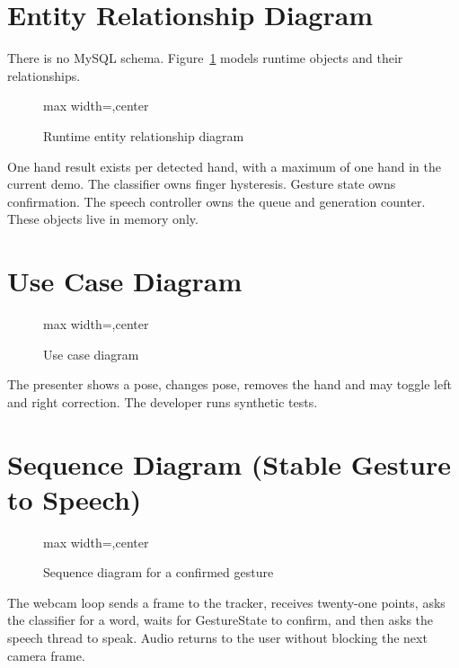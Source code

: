 \section{Entity Relationship Diagram}
There is no MySQL schema. Figure~\ref{fig:er} models runtime objects and their relationships.

\begin{figure}[H]
\centering
\begin{adjustbox}{max width=\textwidth,center}

\end{adjustbox}
\caption{Runtime entity relationship diagram}
\label{fig:er}
\end{figure}

One hand result exists per detected hand, with a maximum of one hand in the current demo. The classifier owns finger hysteresis. Gesture state owns confirmation. The speech controller owns the queue and generation counter. These objects live in memory only.

\section{Use Case Diagram}
\begin{figure}[H]
\centering
\begin{adjustbox}{max width=\textwidth,center}

\end{adjustbox}
\caption{Use case diagram}
\label{fig:usecase}
\end{figure}

The presenter shows a pose, changes pose, removes the hand and may toggle left and right correction. The developer runs synthetic tests.

\section{Sequence Diagram (Stable Gesture to Speech)}
\begin{figure}[H]
\centering
\begin{adjustbox}{max width=\textwidth,center}

\end{adjustbox}
\caption{Sequence diagram for a confirmed gesture}
\label{fig:seq}
\end{figure}

The webcam loop sends a frame to the tracker, receives twenty-one points, asks the classifier for a word, waits for GestureState to confirm, and then asks the speech thread to speak. Audio returns to the user without blocking the next camera frame.

